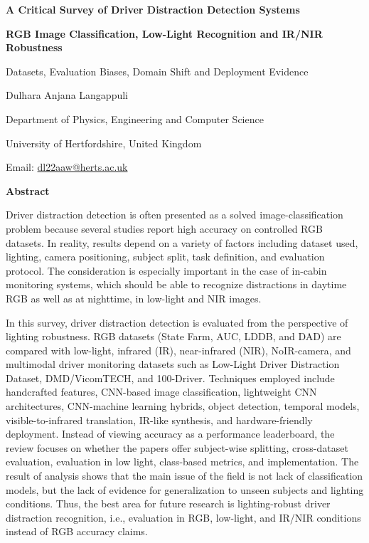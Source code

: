 \documentclass[11pt,a4paper]{article}
\begin{document}
\thispagestyle{empty}

\begin{center}
{\LARGE\bfseries A Critical Survey of Driver Distraction Detection Systems\par}
\vspace{3pt}
{\Large\bfseries RGB Image Classification, Low-Light Recognition and IR/NIR Robustness\par}
\vspace{6pt}
{\large Datasets, Evaluation Biases, Domain Shift and Deployment Evidence\par}
\vspace{14pt}

{\normalsize Dulhara Anjana Langappuli\par}
{\normalsize Department of Physics, Engineering and Computer Science\par}
{\normalsize University of Hertfordshire, United Kingdom\par}
{\normalsize Email: \href{mailto:dl22aaw@herts.ac.uk}{dl22aaw@herts.ac.uk}\par}
\vspace{8pt}
\end{center}

\begin{center}
\textbf{Abstract}
\end{center}

\noindent
Driver distraction detection is often presented as a solved image-classification problem because several studies report high accuracy on controlled RGB datasets. In reality, results depend on a variety of factors including dataset used, lighting, camera positioning, subject split, task definition, and evaluation protocol. The consideration is especially important in the case of in-cabin monitoring systems, which should be able to recognize distractions in daytime RGB as well as at nighttime, in low-light and NIR images.

In this survey, driver distraction detection is evaluated from the perspective of lighting robustness. RGB datasets (State Farm, AUC, LDDB, and DAD) are compared with low-light, infrared (IR), near-infrared (NIR), NoIR-camera, and multimodal driver monitoring datasets such as Low-Light Driver Distraction Dataset, DMD/VicomTECH, and 100-Driver. Techniques employed include handcrafted features, CNN-based image classification, lightweight CNN architectures, CNN-machine learning hybrids, object detection, temporal models, visible-to-infrared translation, IR-like synthesis, and hardware-friendly deployment. Instead of viewing accuracy as a performance leaderboard, the review focuses on whether the papers offer subject-wise splitting, cross-dataset evaluation, evaluation in low light, class-based metrics, and implementation. The result of analysis shows that the main issue of the field is not lack of classification models, but the lack of evidence for generalization to unseen subjects and lighting conditions. Thus, the best area for future research is lighting-robust driver distraction recognition, i.e., evaluation in RGB, low-light, and IR/NIR conditions instead of RGB accuracy claims.
\end{document}
